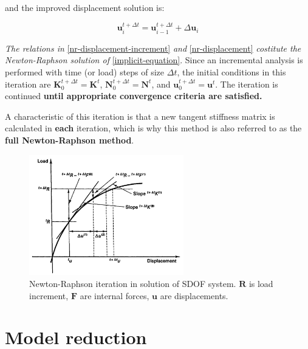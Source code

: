 \documentclass[10pt,b5paper,titlepage]{book}
\begin{document}
and the improved displacement solution is:

\begin{equation}\label{nr-displacement}
    \mathbf{u}_i^{t + \Delta t} =
    \mathbf{u}_{i-1}^{t + \Delta t} +
    \Delta \mathbf{u}_{i}
\end{equation}

\textit{The relations in} \eqref{nr-displacement-increment} \textit{and} \eqref{nr-displacement}
\textit{costitute the Newton-Raphson solution of} \eqref{implicit-equation}.
Since an incremental analysis is performed with time (or load) steps of size
$ \Delta t $, the initial conditions in this iteration are
$ \mathbf{K}_0^{t + \Delta t} = \mathbf{K}^t $,
$ \mathbf{N}_0^{t + \Delta t} = \mathbf{N}^t $, and
$ \mathbf{u}_0^{t + \Delta t} = \mathbf{u}^t $.
The iteration is continued \textbf{until appropriate convergence criteria are satisfied.}

A characteristic of this iteration is that a new tangent stiffness matrix is
calculated in \textbf{each} iteration, which is why this method is also referred
to as the \textbf{full Newton-Raphson method}.

\begin{figure}[ht]
    \centering
    \includegraphics[width=0.60\textwidth]{img/full_newton_raphson.png}
    \caption{Newton-Raphson iteration in solution of SDOF system.
    $ \mathbf{R} $ is load increment, $ \mathbf{F} $ are internal forces,
    $ \mathbf{u} $ are displacements.}
    \label{fig:full-newton-raphson-png}
\end{figure}







\newpage
\chapter{Model reduction}
\end{document}
